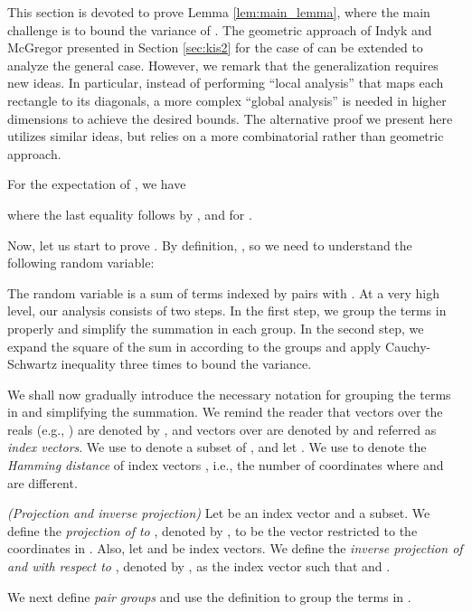 \def\draft{0}  \documentclass[proceedings]{stacs}
\theoremstyle{plain}\newtheorem{satz}[thm]{Satz}
\theoremstyle{definition}\newtheorem{crucial}[thm]{Crucial Definition}
\begin{document}
This section is devoted to prove Lemma \ref{lem:main_lemma}, where the main challenge is to bound the variance of .  The geometric approach of Indyk and McGregor \cite{IM08} presented in Section \ref{sec:kis2} for the case of  can be extended to analyze the general case. However, we remark that the generalization requires new ideas. In particular, instead of performing ``local analysis'' that maps each rectangle to its diagonals, a more complex ``global analysis'' is needed in higher dimensions to achieve the desired bounds. The alternative proof we present here utilizes similar ideas, but relies on a more combinatorial rather than geometric approach.

For the expectation of , we have

where the last equality follows by , and  for .

Now, let us start to prove . By definition, , so we need to understand the following random variable:

The random variable  is a sum of terms indexed by pairs  with . At a very high level, our analysis consists of two steps. In the first step, we group the terms in  properly and simplify the summation in each group. In the second step,  we expand the square of the sum in  according to the groups and apply Cauchy-Schwartz inequality three times to bound the variance.





We shall now gradually introduce the necessary notation for grouping the terms in  and simplifying the summation. We remind the reader that vectors over the reals (e.g., ) are denoted by , and vectors over  are denoted by  and referred as \emph{index vectors}.  We use  to denote a subset of , and let . We use  to denote the \emph{Hamming distance} of index vectors , i.e., the number of coordinates where  and  are different. 



\begin{definition}\label{def:projection} \emph{(Projection and inverse projection)} Let  be an index vector and  a subset. We define the \emph{projection of  to }, denoted by , to be the vector  restricted to the coordinates in .
Also, let  and  be index vectors. We define the \emph{inverse projection of  and  with respect to }, denoted by , as the index vector  such that  and .
\end{definition}



We next define \emph{pair groups} and use the definition to group the terms in .
\end{document}
